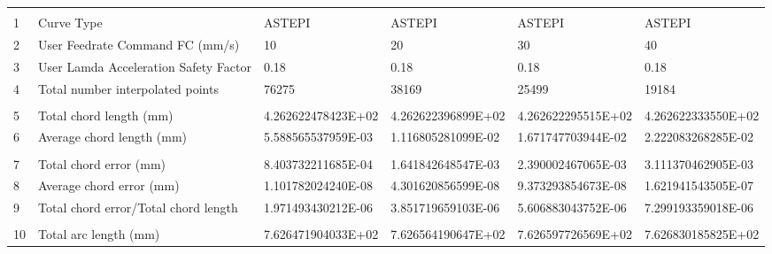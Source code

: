 

\begin{tabular}{ p{0.5cm} p{8.0cm} p{4.00cm} p{4.0cm} p{4.00cm} p{4.0cm}}
\hline
	&                                                      &                    &                      &                    & \\
1	& Curve Type	                                       & ASTEPI             & ASTEPI	           & ASTEPI             &	ASTEPI \\
2	& User Feedrate Command FC (mm/s)                      &	10	            &    20                &	30	            &    40 \\
3	& User Lamda Acceleration Safety Factor	               &   0.18             &	0.18               &   0.18             &   0.18 \\
4	& Total number interpolated points	                   &   76275	        & 38169	               & 25499	            &  19184 \\
	&                                                      &                    &                      &                    & \\
5	& Total chord length (mm)	                           & 4.262622478423E+02	& 4.262622396899E+02   & 4.262622295515E+02	& 4.262622333550E+02 \\
6	& Average chord length (mm)	                           & 5.588565537959E-03	& 1.116805281099E-02   & 1.671747703944E-02	& 2.222083268285E-02 \\
	&                                                      &                    &                      &                    & \\
7	& Total chord error (mm)	                           & 8.403732211685E-04	& 1.641842648547E-03   & 2.390002467065E-03	& 3.111370462905E-03 \\
8	& Average chord error (mm)	                           & 1.101782024240E-08	& 4.301620856599E-08   & 9.373293854673E-08	& 1.621941543505E-07 \\
9	& Total chord error/Total chord length                 & 1.971493430212E-06	& 3.851719659103E-06   & 5.606883043752E-06	& 7.299193359018E-06 \\
	&                                                      &                    &                      &                    & \\
10	& Total arc length (mm)	                               & 7.626471904033E+02	& 7.626564190647E+02   & 7.626597726569E+02	& 7.626830185825E+02 \\

\end{tabular}
